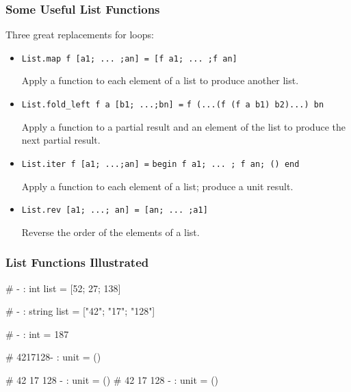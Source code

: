 \documentclass{plt}
\begin{document}
\begin{frame}[fragile]
  \frametitle{Some Useful List Functions}

Three great replacements for loops:

\begin{itemize}

\item \verb|List.map f [a1; ... ;an] = [f a1; ... ;f an]|

Apply a function to each element of a list to produce another list.

\item \verb|List.fold_left f a [b1; ...;bn] =| \verb|f (...(f (f a b1) b2)...) bn|

Apply a function to a partial result and an element of the list to
produce the next partial result.

\item \verb|List.iter f [a1; ...;an] =| \break \verb|begin f a1; ... ; f an; () end|

Apply a function to each element of a list; produce a unit result.

\item \verb|List.rev [a1; ...; an] = [an; ... ;a1]|

Reverse the order of the elements of a list.

\end{itemize}

\end{frame}

\begin{frame}[fragile]
  \frametitle{List Functions Illustrated}

\begin{interactive}
# 
- : int list = [52; 27; 138]

# 
- : string list = ["42"; "17"; "128"]

# 
- : int = 187

# 
4217128- : unit = ()

# 
42
17
128
- : unit = ()
# 
42
17
128
- : unit = ()
\end{interactive}

\end{frame}
\end{document}
